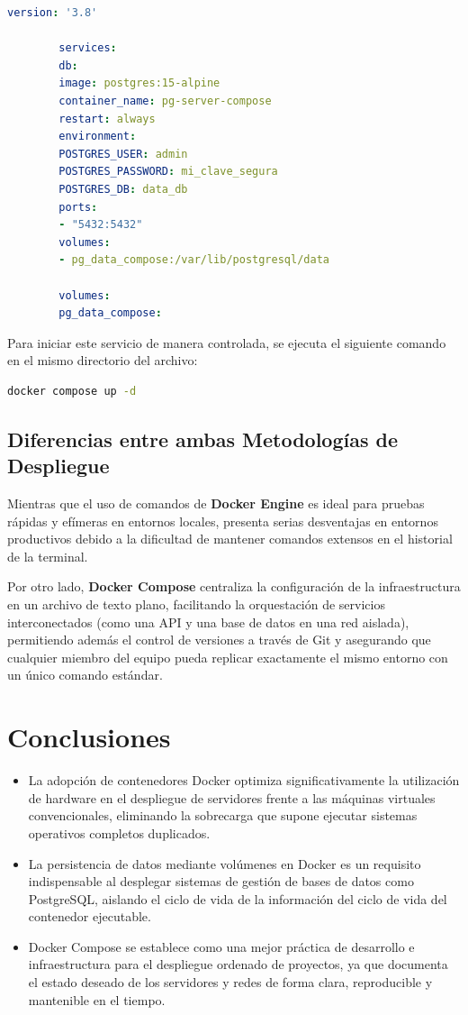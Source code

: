 \documentclass[12pt, doc]{apa7} %
\begin{document}
	\begin{lstlisting}[language=yaml, caption={Archivo docker-compose.yml para PostgreSQL}]
		version: '3.8'
		
		services:
		db:
		image: postgres:15-alpine
		container_name: pg-server-compose
		restart: always
		environment:
		POSTGRES_USER: admin
		POSTGRES_PASSWORD: mi_clave_segura
		POSTGRES_DB: data_db
		ports:
		- "5432:5432"
		volumes:
		- pg_data_compose:/var/lib/postgresql/data
		
		volumes:
		pg_data_compose:
	\end{lstlisting}
	
	Para iniciar este servicio de manera controlada, se ejecuta el siguiente comando en el mismo directorio del archivo:
	\begin{lstlisting}[language=bash, caption={Comando para inicializar Docker Compose}]
		docker compose up -d
	\end{lstlisting}
	
	\subsection{Diferencias entre ambas Metodologías de Despliegue}
	Mientras que el uso de comandos de \textbf{Docker Engine} es ideal para pruebas rápidas y efímeras en entornos locales, presenta serias desventajas en entornos productivos debido a la dificultad de mantener comandos extensos en el historial de la terminal. 
	
	Por otro lado, \textbf{Docker Compose} centraliza la configuración de la infraestructura en un archivo de texto plano, facilitando la orquestación de servicios interconectados (como una API y una base de datos en una red aislada), permitiendo además el control de versiones a través de Git y asegurando que cualquier miembro del equipo pueda replicar exactamente el mismo entorno con un único comando estándar.
	
	\section{Conclusiones}
	\begin{itemize}
		\item La adopción de contenedores Docker optimiza significativamente la utilización de hardware en el despliegue de servidores frente a las máquinas virtuales convencionales, eliminando la sobrecarga que supone ejecutar sistemas operativos completos duplicados.
		\item La persistencia de datos mediante volúmenes en Docker es un requisito indispensable al desplegar sistemas de gestión de bases de datos como PostgreSQL, aislando el ciclo de vida de la información del ciclo de vida del contenedor ejecutable.
		\item Docker Compose se establece como una mejor práctica de desarrollo e infraestructura para el despliegue ordenado de proyectos, ya que documenta el estado deseado de los servidores y redes de forma clara, reproducible y mantenible en el tiempo.
	\end{itemize}
	
	\nocite{*} %
	\printbibliography[title={Referencias}]
	
\end{document}
